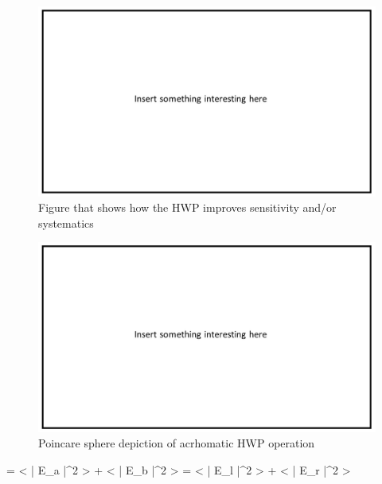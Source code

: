 \begin{figure}
    \centering
    \includegraphics[width=0.98\linewidth]{Other/empty.jpg}
    \caption[Figure that shows how the HWP improves sensitivity and/or systematics]{Figure that shows how the HWP improves sensitivity and/or systematics}
    \label{fig:hwp_systematics}
\end{figure}

\begin{figure}
    \centering
    \includegraphics[width=0.98\linewidth]{Other/empty.jpg}
    \caption[Poincare sphere depiction of acrhomatic HWP operation]{Poincare sphere depiction of acrhomatic HWP operation}
    \label{fig:poincarel}
\end{figure}

=  \left< \left| E_{a} \right|^{2} \right> + \left< \left| E_{b} \right|^{2} \right> = \left< \left| E_{l} \right|^{2} \right> + \left< \left| E_{r} \right|^{2} \right>

